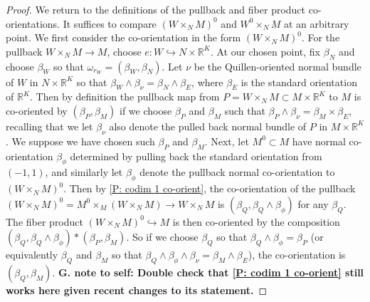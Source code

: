 \documentclass[12pt]{article}
\theoremstyle{plain}
\theoremstyle{definition}
\theoremstyle{remark}
\newcommand{\into}{\hookrightarrow}
\newcommand{\R}{\mathbb{R}}
\begin{document}
\begin{proof}
	We return to the definitions of the pullback and fiber product co-orientations.
	It suffices to compare $(W \times_N M)^0$ and $W^0 \times_N M$ at an arbitrary point.
	We first consider the co-orientation in the form $(W \times_N M)^0$.
	For the pullback $W \times_N M \to M$, choose $e \colon W \into N \times \R^K$.
	At our chosen point, fix $\beta_N$ and choose $\beta_W$ so that $\omega_{r_W} = (\beta_W,\beta_N)$.
	Let $\nu$ be the Quillen-oriented normal bundle of $W$ in $N \times \R^K$ so that $\beta_W \wedge \beta_\nu = \beta_N \wedge \beta_E$, where $\beta_E$ is the standard orientation of $\R^K$.
	Then by definition the pullback map from $P = W \times_N M \subset M \times \R^K$ to $M$ is co-oriented by $(\beta_P,\beta_M)$ if we choose $\beta_P$ and $\beta_M$ such that $\beta_P \wedge \beta_\nu = \beta_M \times \beta_E$, recalling that we let $\beta_\nu$ also denote the pulled back normal bundle of $P$ in $M \times \R^K$.
	We suppose we have chosen such $\beta_P$ and $\beta_M$.
	Next, let $M^0 \subset M$ have normal co-orientation $\beta_\phi$ determined by pulling back the standard orientation from $(-1,1)$, and similarly let $\beta_\phi$ denote the pullback normal co-orientation to $(W \times_N M)^0$.
	Then by \cref{P: codim 1 co-orient}, the co-orientation of the pullback $(W \times_N M)^0 = M^0 \times_M (W \times_N M) \to W \times_N M$ is $(\beta_Q,\beta_Q \wedge \beta_\phi)$ for any $\beta_Q$.
	The fiber product $(W \times_N M)^0 \into M$ is then co-oriented by the composition $(\beta_Q,\beta_Q \wedge \beta_\phi)*(\beta_P,\beta_M)$.
	So if we choose $\beta_Q$ so that $\beta_Q \wedge \beta_\phi = \beta_P$ (or equivalently $\beta_Q$ and $\beta_M$ so that $\beta_Q \wedge \beta_\phi \wedge \beta_\nu = \beta_M \wedge \beta_E$), the co-orientation is $(\beta_Q,\beta_M)$.
	\textbf{G. note to self: Double check that \cref{P: codim 1 co-orient} still works here given recent changes to its statement.}


\end{proof}
\end{document}

